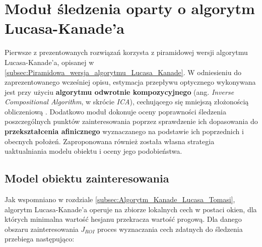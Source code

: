 \chapter{Moduł śledzenia oparty o algorytm Lucasa-Kanade'a}
\label{cha:Modul_sledzenia_oparty_o_algorytm_Lucasa_Kanadea}

Pierwsze z prezentowanych rozwiązań korzysta z piramidowej wersji algorytmu Lucasa-Kanade'a, opisanej w  \ref{subsec:Piramidowa_wersja_algorytmu_Lucasa_Kanade}. W odniesieniu do zaprezentowanego wcześniej opisu, estymacja przepływu optycznego wykonywana jest przy użyciu \textbf{algorytmu odwrotnie kompozycyjnego} (ang. \textit{Inverse Compositional Algorithm}, w skrócie \textit{ICA}), cechującego się mniejszą złożonością obliczeniową \cite{Baker2004}. Dodatkowo moduł dokonuje oceny poprawności śledzenia poszczególnych punktów zainteresowania poprzez sprawdzenie ich dopasowania do \textbf{przekształcenia afinicznego} wyznaczanego na podstawie ich poprzednich i obecnych położeń. Zaproponowana również została własna strategia uaktualniania modelu obiektu i oceny jego podobieństwa.

\section{Model obiektu zainteresowania}
\label{sec:LK_Model_obiektu}

Jak wspomniano w rozdziale \ref{subsec:Algorytm_Kanade_Lucasa_Tomasi}, algorytm Lucasa-Kanade'a operuje na zbiorze lokalnych cech w postaci okien, dla których minimalna wartość hesjanu przekracza wartość progową. Dla danego obszaru zainteresowania $J_{ROI}$ proces wyznaczania cech zdatnych do śledzenia przebiega następująco:

